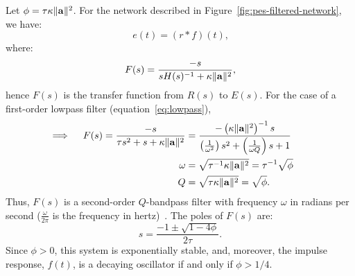 \begin{theorem}
\label{thm:pes-filtered}
{\normalfont \citep{voelker2017c}}
\newline
Let $\phi = \tau \kappa \|\mathbf{a}\|^2$.
For the network described in Figure~\ref{fig:pes-filtered-network}, we have:
\begin{equation}
\label{eq:time-domain}
e(t) = (r \ast f)(t) \text{,}
\end{equation}
where: %
\begin{equation}
\label{eq:s-domain}
F(s) = \frac{-s}{s H(s)^{-1} + \kappa \|\mathbf{a}\|^2} \text{,} 
\end{equation}
hence $F(s)$ is the transfer function from $R(s)$ to $E(s)$.
For the case of a first-order lowpass filter (equation~\ref{eq:lowpass}),
\begin{align}
\label{eq:lowpass-solution}
\implies \quad F(s) = \frac{-s}{\tau s^2 + s + \kappa \|\mathbf{a}\|^2} &= \frac{-\left( \kappa \|\mathbf{a}\|^2 \right)^{-1} s}{\left(\frac{1}{\omega^2}\right)s^2 + \left(\frac{1}{\omega Q}\right) s + 1} \quad\quad \\
\omega &= \sqrt{\tau^{-1} \kappa \|\mathbf{a}\|^2 } \label{eq:bandpass-w} = \tau^{-1} \sqrt{\phi} \\
Q &= \sqrt{\tau \kappa \|\mathbf{a}\|^2 } = \sqrt{\phi} \label{eq:bandpass-Q} \text{.}
\end{align}
Thus, $F(s)$ is a second-order $Q$-bandpass filter with frequency $\omega$ in radians per second ($\frac{\omega}{2 \pi}$ is the frequency in hertz)~\citep[][pp.~8.9--8.10]{zumbahlen2011linear}.
The poles of $F(s)$ are:
\begin{equation}
\label{eq:poles}
s = \frac{-1 \pm \sqrt{1 - 4 \phi}}{2\tau} \text{.}
\end{equation}
Since $\phi > 0$, this system is exponentially stable, and, moreover, the impulse response, $f(t)$, is a decaying oscillator if and only if $\phi > 1/4$.
\end{theorem}

